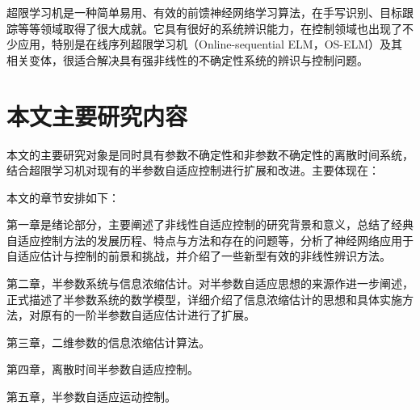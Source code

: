 超限学习机是一种简单易用、有效的前馈神经网络学习算法，在手写识别、目标跟踪等等领域取得了很大成就。它具有很好的系统辨识能力，在控制领域也出现了不少应用，特别是在线序列超限学习机（Online-sequential ELM，OS-ELM）及其相关变体，很适合解决具有强非线性的不确定性系统的辨识与控制问题。

\section{本文主要研究内容}\label{sect:1.3}

本文的主要研究对象是同时具有参数不确定性和非参数不确定性的离散时间系统，结合超限学习机对现有的半参数自适应控制进行扩展和改进。主要体现在：

本文的章节安排如下：

第一章是绪论部分，主要阐述了非线性自适应控制的研究背景和意义，总结了经典自适应控制方法的发展历程、特点与方法和存在的问题等，分析了神经网络应用于自适应估计与控制的前景和挑战，并介绍了一些新型有效的非线性辨识方法。

第二章，半参数系统与信息浓缩估计。对半参数自适应思想的来源作进一步阐述，正式描述了半参数系统的数学模型，详细介绍了信息浓缩估计的思想和具体实施方法，对原有的一阶半参数自适应估计进行了扩展。

第三章，二维参数的信息浓缩估计算法。

第四章，离散时间半参数自适应控制。

第五章，半参数自适应运动控制。
